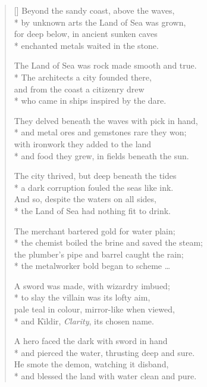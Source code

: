 \settowidth{\versewidth}{Beyond the Western coast, above the waves,}
\begin{verse}[\versewidth]
Beyond the sandy coast, above the waves,\\*
by unknown arts the Land of Sea was grown,\\
for deep below, in ancient sunken caves\\*
enchanted metals waited in the stone.

The Land of Sea was rock made smooth and true.\\*
The architects a city founded there,\\
and from the coast a citizenry drew\\*
who came in ships inspired by the dare.

They delved beneath the waves with pick in hand,\\*
and metal ores and gemstones rare they won;\\
with ironwork they added to the land\\*
and food they grew, in fields beneath the sun.

The city thrived, but deep beneath the tides\\*
a dark corruption fouled the seas like ink.\\
And so, despite the waters on all sides,\\*
the Land of Sea had nothing fit to drink.

The merchant bartered gold for water plain;\\*
the chemist boiled the brine and saved the steam;\\
the plumber's pipe and barrel caught the rain;\\*
the metalworker bold began to scheme \ldots

A sword was made, with wizardry imbued;\\*
to slay the villain was its lofty aim,\\
pale teal in colour, mirror-like when viewed,\\*
and K\=\i{}ldir, \emph{Clarity}, its chosen name.

A hero faced the dark with sword in hand\\*
and pierced the water, thrusting deep and sure.\\
He smote the demon, watching it disband,\\*
and blessed the land with water clean and pure.
\end{verse}

